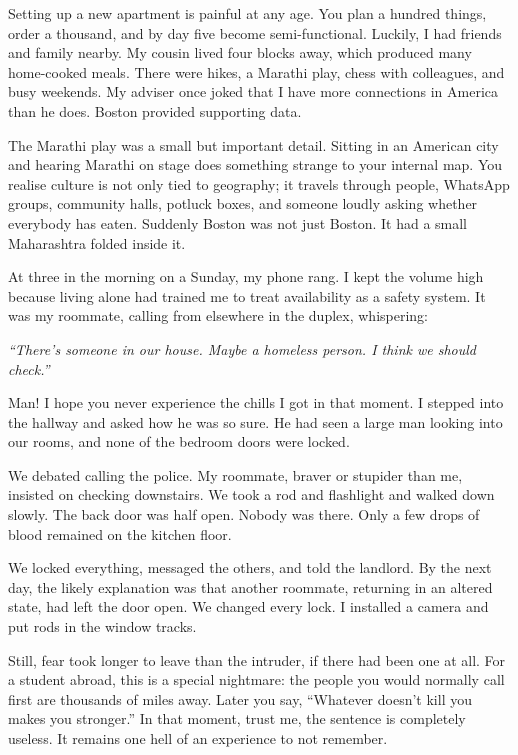 \documentclass[11pt,twoside,openany]{book}
\newcommand{\scene}{\par\vspace{0.7em}{\centering\color{accent}\rule{0.85cm}{0.6pt}\par}\vspace{0.5em}\noindent\ignorespaces}
\begin{document}
Setting up a new apartment is painful at any age. You plan a hundred things,
order a thousand, and by day five become semi-functional. Luckily, I had
friends and family nearby. My cousin lived four blocks away, which produced
many home-cooked meals. There were hikes, a Marathi play, chess with
colleagues, and busy weekends. My adviser once joked that I have more
connections in America than he does. Boston provided supporting data.

The Marathi play was a small but important detail. Sitting in an American city
and hearing Marathi on stage does something strange to your internal map. You
realise culture is not only tied to geography; it travels through people,
WhatsApp groups, community halls, potluck boxes, and someone loudly asking
whether everybody has eaten. Suddenly Boston was not just Boston. It had a
small Maharashtra folded inside it.

\scene

At three in the morning on a Sunday, my phone rang. I kept the volume high
because living alone had trained me to treat availability as a safety system.
It was my roommate, calling from elsewhere in the duplex, whispering:

\begin{pquote}\itshape
``There's someone in our house. Maybe a homeless person. I think we should check.''
\end{pquote}

Man! I hope you never experience the chills I got in that moment. I stepped
into the hallway and asked how he was so sure. He had seen a large man looking
into our rooms, and none of the bedroom doors were locked.

We debated calling the police. My roommate, braver or stupider than me,
insisted on checking downstairs. We took a rod and flashlight and walked down
slowly. The back door was half open. Nobody was there. Only a few drops of
blood remained on the kitchen floor.

We locked everything, messaged the others, and told the landlord. By the next
day, the likely explanation was that another roommate, returning in an altered
state, had left the door open. We changed every lock. I installed a camera and
put rods in the window tracks.

Still, fear took longer to leave than the intruder, if there had been one at
all. For a student abroad, this is a special nightmare: the people you would
normally call first are thousands of miles away. Later you say, ``Whatever
doesn't kill you makes you stronger.'' In that moment, trust me, the sentence
is completely useless. It remains one hell of an experience to not remember.
\end{document}

